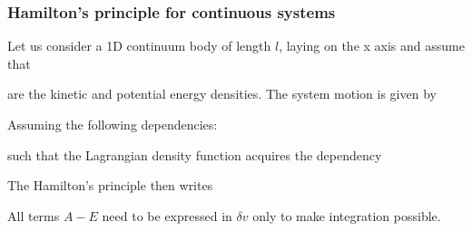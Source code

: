 \documentclass[10pt,a4paper]{scrartcl}
\begin{document}
\begin{multicols*}{2}

\subsubsection{Hamilton's principle for continuous systems}

Let us consider a 1D continuum body of length $l$, laying on the x axis and assume that


are the kinetic and potential energy densities. The system motion is given by 


Assuming the following dependencies:


such that the Lagrangian density function acquires the dependency


The Hamilton's principle then writes 


All terms $A-E$ need to be expressed in $\delta v$ only to make integration possible.


\end{multicols*}
\end{document}
